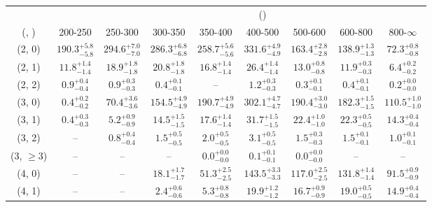 \begin{table}[h!]
\tiny
\centering
{}
\begin{tabular}
{ccccccccc}
	\hline\hline
&	& \multicolumn{8}{c}{\scalht (\gev)} \\ 
	 (\njet,  \nb) & 200-250 & 250-300 & 300-350 & 350-400 & 400-500 & 500-600 & 600-800 & 800-$\infty$ \\ [0.8ex] 
\hline
	(2, 0) & $190.3^{+ 5.8 }_{- 5.8 }$ & $294.6^{+ 7.0 }_{- 7.0 }$ & $286.3^{+ 6.8 }_{- 6.8 }$ & $258.7^{+ 5.6 }_{- 5.6 }$ & $331.6^{+ 4.9 }_{- 4.9 }$ & $163.4^{+ 2.8 }_{- 2.8 }$ & $138.9^{+ 1.3 }_{- 1.3 }$ & $72.3^{+ 0.8 }_{- 0.8 }$ \\[0.5ex] 
	(2, 1) & $11.8^{+ 1.4 }_{- 1.4 }$ & $18.9^{+ 1.8 }_{- 1.8 }$ & $20.8^{+ 1.8 }_{- 1.8 }$ & $16.8^{+ 1.4 }_{- 1.4 }$ & $26.4^{+ 1.4 }_{- 1.4 }$ & $13.0^{+ 0.8 }_{- 0.8 }$ & $11.9^{+ 0.3 }_{- 0.3 }$ & $6.4^{+ 0.2 }_{- 0.2 }$ \\[0.5ex] 
	(2, 2) & $0.9^{+ 0.4 }_{- 0.4 }$ & $0.9^{+ 0.3 }_{- 0.3 }$ & $0.4^{+ 0.1 }_{- 0.1 }$ & -- & $1.2^{+ 0.3 }_{- 0.3 }$ & $0.3^{+ 0.1 }_{- 0.1 }$ & $0.4^{+ 0.1 }_{- 0.1 }$ & $0.2^{+ 0.0 }_{- 0.0 }$ \\[0.5ex] 
	(3, 0) & $0.4^{+ 0.2 }_{- 0.2 }$ & $70.4^{+ 3.6 }_{- 3.6 }$ & $154.5^{+ 4.9 }_{- 4.9 }$ & $190.7^{+ 4.9 }_{- 4.9 }$ & $302.1^{+ 4.7 }_{- 4.7 }$ & $190.4^{+ 3.0 }_{- 3.0 }$ & $182.3^{+ 1.5 }_{- 1.5 }$ & $110.5^{+ 1.0 }_{- 1.0 }$ \\[0.5ex] 
	(3, 1) & $0.4^{+ 0.3 }_{- 0.3 }$ & $5.2^{+ 0.9 }_{- 0.9 }$ & $14.5^{+ 1.5 }_{- 1.5 }$ & $17.6^{+ 1.4 }_{- 1.4 }$ & $31.7^{+ 1.5 }_{- 1.5 }$ & $22.4^{+ 1.0 }_{- 1.0 }$ & $22.3^{+ 0.5 }_{- 0.5 }$ & $14.3^{+ 0.4 }_{- 0.4 }$ \\[0.5ex] 
	(3, 2) & -- & $0.8^{+ 0.4 }_{- 0.4 }$ & $1.5^{+ 0.5 }_{- 0.5 }$ & $2.0^{+ 0.5 }_{- 0.5 }$ & $3.1^{+ 0.5 }_{- 0.5 }$ & $1.5^{+ 0.3 }_{- 0.3 }$ & $1.5^{+ 0.1 }_{- 0.1 }$ & $1.0^{+ 0.1 }_{- 0.1 }$ \\[0.5ex] 
	(3, $\ge3$) & -- & -- & -- & $0.0^{+ 0.0 }_{- 0.0 }$ & $0.1^{+ 0.1 }_{- 0.1 }$ & $0.0^{+ 0.0 }_{- 0.0 }$ & -- & -- \\[0.5ex] 
	(4, 0) & -- & -- & $18.1^{+ 1.7 }_{- 1.7 }$ & $51.3^{+ 2.5 }_{- 2.5 }$ & $143.5^{+ 3.3 }_{- 3.3 }$ & $117.0^{+ 2.5 }_{- 2.5 }$ & $131.8^{+ 1.4 }_{- 1.4 }$ & $91.5^{+ 0.9 }_{- 0.9 }$ \\[0.5ex] 
	(4, 1) & -- & -- & $2.4^{+ 0.6 }_{- 0.6 }$ & $5.3^{+ 0.8 }_{- 0.8 }$ & $19.9^{+ 1.2 }_{- 1.2 }$ & $16.7^{+ 0.9 }_{- 0.9 }$ & $19.0^{+ 0.5 }_{- 0.5 }$ & $14.9^{+ 0.4 }_{- 0.4 }$ \\[0.5ex] 

\end{tabular}
\end{table}
